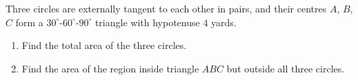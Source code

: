 Three circles are externally tangent to each other in pairs, and their centres $A$, $B$, $C$ form a $30^\circ$-$60^\circ$-$90^\circ$ triangle with hypotenuse $4$ yards.
\begin{enumerate}
\item[(a)] Find the total area of the three circles.
\item[(b)] Find the area of the region inside triangle $ABC$ but outside all three circles.
\end{enumerate}
